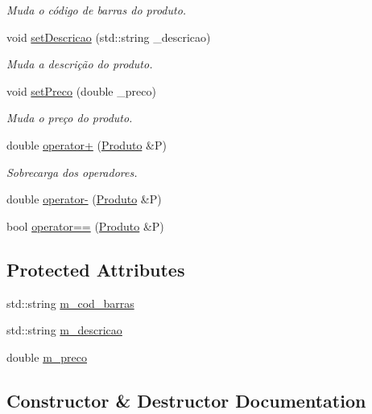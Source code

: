 \begin{DoxyCompactItemize}
\begin{DoxyCompactList}\small\item\em Muda o código de barras do produto. \end{DoxyCompactList}\item 
void \hyperlink{classproduto_1_1Produto_ad4398a2c1dbc54dc2b164df3b2798dc8}{set\+Descricao} (std\+::string \+\_\+descricao)
\begin{DoxyCompactList}\small\item\em Muda a descrição do produto. \end{DoxyCompactList}\item 
void \hyperlink{classproduto_1_1Produto_ac2b62968f13523baabc910e0ca10a412}{set\+Preco} (double \+\_\+preco)
\begin{DoxyCompactList}\small\item\em Muda o preço do produto. \end{DoxyCompactList}\item 
double \hyperlink{classproduto_1_1Produto_a533fce73a66e09411c27ba8a71d985ef}{operator+} (\hyperlink{classproduto_1_1Produto}{Produto} \&P)
\begin{DoxyCompactList}\small\item\em Sobrecarga dos operadores. \end{DoxyCompactList}\item 
double \hyperlink{classproduto_1_1Produto_aa9bd99956208c019f714a4ed53d6986c}{operator-\/} (\hyperlink{classproduto_1_1Produto}{Produto} \&P)
\item 
bool \hyperlink{classproduto_1_1Produto_af2cb621ae73fbd2369dec3070b2c5ac3}{operator==} (\hyperlink{classproduto_1_1Produto}{Produto} \&P)
\end{DoxyCompactItemize}
\subsection*{Protected Attributes}
\begin{DoxyCompactItemize}
\item 
std\+::string \hyperlink{classproduto_1_1Produto_af441e885b23e4b6782be22c0be25ba72}{m\+\_\+cod\+\_\+barras}
\item 
std\+::string \hyperlink{classproduto_1_1Produto_a17af898b167c20f905f3d2d16f7aeac0}{m\+\_\+descricao}
\item 
double \hyperlink{classproduto_1_1Produto_aaa3f0f133345202eafcb2fa72248e05d}{m\+\_\+preco}
\end{DoxyCompactItemize}


\subsection{Constructor \& Destructor Documentation}
\mbox{\label{classproduto_1_1Produto_ac3d96768b8b6b67ae8066b704761071a}} 
